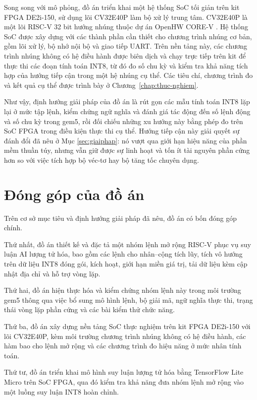 \documentclass[../DoAn.tex]{subfiles}
\begin{document}
Song song với mô phỏng, đồ án triển khai một hệ thống SoC tối giản trên kit FPGA DE2i-150, sử dụng lõi CV32E40P làm bộ xử lý trung tâm. CV32E40P là một lõi RISC-V 32 bit hướng nhúng thuộc dự án OpenHW CORE-V \cite{openhw_cv32e40p_um_2024}. Hệ thống SoC được xây dựng với các thành phần cần thiết cho chương trình nhúng cơ bản, gồm lõi xử lý, bộ nhớ nội bộ và giao tiếp UART. Trên nền tảng này, các chương trình nhúng không có hệ điều hành được biên dịch và chạy trực tiếp trên kit để thực thi các đoạn tính toán INT8, từ đó đo số chu kỳ và kiểm tra khả năng tích hợp của hướng tiếp cận trong một hệ nhúng cụ thể. Các tiêu chí, chương trình đo và kết quả cụ thể được trình bày ở Chương~\ref{chap:thuc-nghiem}.

Như vậy, định hướng giải pháp của đồ án là rút gọn các mẫu tính toán INT8 lặp lại ở mức tập lệnh, kiểm chứng ngữ nghĩa và đánh giá tác động đến số lệnh động và số chu kỳ trong gem5, rồi đối chiếu những xu hướng này bằng phép đo trên SoC FPGA trong điều kiện thực thi cụ thể. Hướng tiếp cận này giải quyết sự đánh đổi đã nêu ở Mục \ref{sec:giaiphap}: nó vượt qua giới hạn hiệu năng của phần mềm thuần túy, nhưng vẫn giữ được sự linh hoạt và tốn ít tài nguyên phần cứng hơn so với việc tích hợp bộ véc-tơ hay bộ tăng tốc chuyên dụng.

\section{Đóng góp của đồ án}

Trên cơ sở mục tiêu và định hướng giải pháp đã nêu, đồ án có bốn đóng góp chính.

Thứ nhất, đồ án thiết kế và đặc tả một nhóm lệnh mở rộng RISC-V phục vụ suy luận AI lượng tử hóa, bao gồm các lệnh cho nhân--cộng tích lũy, tích vô hướng trên dữ liệu INT8 đóng gói, kích hoạt, giới hạn miền giá trị, tải dữ liệu kèm cập nhật địa chỉ và hỗ trợ vòng lặp.

Thứ hai, đồ án hiện thực hóa và kiểm chứng nhóm lệnh này trong môi trường gem5 thông qua việc bổ sung mô hình lệnh, bộ giải mã, ngữ nghĩa thực thi, trạng thái vòng lặp phần cứng và các bài kiểm thử chức năng.

Thứ ba, đồ án xây dựng nền tảng SoC thực nghiệm trên kit FPGA DE2i-150 với lõi CV32E40P, kèm môi trường chương trình nhúng không có hệ điều hành, các hàm bao cho lệnh mở rộng và các chương trình đo hiệu năng ở mức nhân tính toán.

Thứ tư, đồ án triển khai mô hình suy luận lượng tử hóa bằng TensorFlow Lite Micro trên SoC FPGA, qua đó kiểm tra khả năng đưa nhóm lệnh mở rộng vào một luồng suy luận INT8 hoàn chỉnh.
\end{document}
